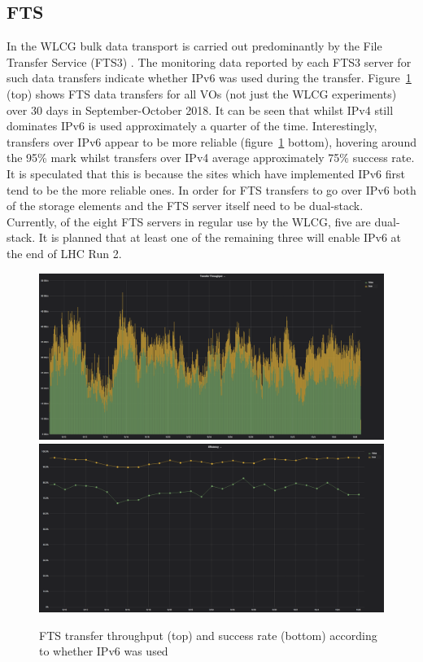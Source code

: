 \subsection{FTS}
In the WLCG bulk data transport is carried out predominantly by the File Transfer Service (FTS3)  \cite{638647551}. The monitoring data reported by each FTS3 server for such data transfers indicate whether IPv6 was used during the transfer. Figure~\ref{fig:fts} (top) shows FTS data transfers \cite{grafana-FTS} for all VOs (not just the WLCG experiments) over 30 days in September-October 2018. It can be seen that whilst IPv4 still dominates IPv6 is used approximately a quarter of the time. Interestingly, transfers over IPv6 appear to be more reliable (figure~\ref{fig:fts} bottom), hovering around the 95\% mark whilst transfers over IPv4 average approximately 75\% success rate. It is speculated that this is because the sites which have implemented IPv6 first tend to be the more reliable ones. In order for FTS transfers to go over IPv6 both of the storage elements and the FTS server itself need to be dual-stack. Currently, of the eight FTS servers in regular use by the WLCG, five are dual-stack. It is planned that at least one of the remaining three will enable IPv6 at the end of LHC Run 2.

\begin{figure}[t]
\centering
\includegraphics[width=13cm]{fts1}
\includegraphics[width=13cm]{fts2}
\caption{FTS transfer throughput (top) and success rate (bottom) according to whether IPv6 was used}
\label{fig:fts}
\end{figure}

